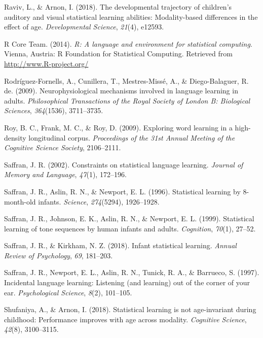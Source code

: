 \documentclass[
  english,
  man,floatsintext]{apa6}
\begin{document}
\leavevmode\hypertarget{ref-raviv2018developmental}{}%
Raviv, L., \& Arnon, I. (2018). The developmental trajectory of children's auditory and visual statistical learning abilities: Modality-based differences in the effect of age. \emph{Developmental Science}, \emph{21}(4), e12593.

\leavevmode\hypertarget{ref-R}{}%
R Core Team. (2014). \emph{R: A language and environment for statistical computing}. Vienna, Austria: R Foundation for Statistical Computing. Retrieved from \url{http://www.R-project.org/}

\leavevmode\hypertarget{ref-rodriguez2009neurophysiological}{}%
Rodríguez-Fornells, A., Cunillera, T., Mestres-Missé, A., \& Diego-Balaguer, R. de. (2009). Neurophysiological mechanisms involved in language learning in adults. \emph{Philosophical Transactions of the Royal Society of London B: Biological Sciences}, \emph{364}(1536), 3711--3735.

\leavevmode\hypertarget{ref-roy2009exploring}{}%
Roy, B. C., Frank, M. C., \& Roy, D. (2009). Exploring word learning in a high-density longitudinal corpus. \emph{Proceedings of the 31st Annual Meeting of the Cognitive Science Society}, 2106--2111.

\leavevmode\hypertarget{ref-saffran2002constraints}{}%
Saffran, J. R. (2002). Constraints on statistical language learning. \emph{Journal of Memory and Language}, \emph{47}(1), 172--196.

\leavevmode\hypertarget{ref-saffran1996statistical}{}%
Saffran, J. R., Aslin, R. N., \& Newport, E. L. (1996). Statistical learning by 8-month-old infants. \emph{Science}, \emph{274}(5294), 1926--1928.

\leavevmode\hypertarget{ref-saffran1999statistical}{}%
Saffran, J. R., Johnson, E. K., Aslin, R. N., \& Newport, E. L. (1999). Statistical learning of tone sequences by human infants and adults. \emph{Cognition}, \emph{70}(1), 27--52.

\leavevmode\hypertarget{ref-saffran2018infant}{}%
Saffran, J. R., \& Kirkham, N. Z. (2018). Infant statistical learning. \emph{Annual Review of Psychology}, \emph{69}, 181--203.

\leavevmode\hypertarget{ref-saffran1997incidental}{}%
Saffran, J. R., Newport, E. L., Aslin, R. N., Tunick, R. A., \& Barrueco, S. (1997). Incidental language learning: Listening (and learning) out of the corner of your ear. \emph{Psychological Science}, \emph{8}(2), 101--105.

\leavevmode\hypertarget{ref-shufaniya2018statistical}{}%
Shufaniya, A., \& Arnon, I. (2018). Statistical learning is not age-invariant during childhood: Performance improves with age across modality. \emph{Cognitive Science}, \emph{42}(8), 3100--3115.
\end{document}
